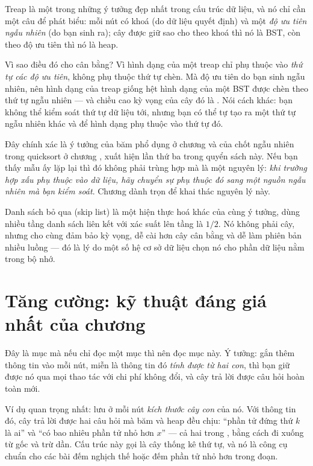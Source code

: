 \documentclass[../../algorithm.tex]{subfiles}
\begin{document}
Treap là một trong những ý tưởng đẹp nhất trong cấu trúc dữ liệu, và nó chỉ cần một câu để phát biểu: mỗi nút có khoá (do dữ liệu quyết định) và một \emph{độ ưu tiên ngẫu nhiên} (do bạn sinh ra); cây được giữ sao cho theo khoá thì nó là BST, còn theo độ ưu tiên thì nó là heap.

Vì sao điều đó cho cân bằng? Vì hình dạng của một treap chỉ phụ thuộc vào \emph{thứ tự các độ ưu tiên}, không phụ thuộc thứ tự chèn. Mà độ ưu tiên do bạn sinh ngẫu nhiên, nên hình dạng của treap giống hệt hình dạng của một BST được chèn theo thứ tự ngẫu nhiên --- và chiều cao kỳ vọng của cây đó là . Nói cách khác: bạn không thể kiểm soát thứ tự dữ liệu tới, nhưng bạn có thể tự tạo ra một thứ tự ngẫu nhiên khác và để hình dạng phụ thuộc vào thứ tự đó.

Đây chính xác là ý tưởng của băm phổ dụng ở chương  và của chốt ngẫu nhiên trong quicksort ở chương , xuất hiện lần thứ ba trong quyển sách này. Nếu bạn thấy mẫu ấy lặp lại thì đó không phải trùng hợp mà là một nguyên lý: \emph{khi trường hợp xấu phụ thuộc vào dữ liệu, hãy chuyển sự phụ thuộc đó sang một nguồn ngẫu nhiên mà bạn kiểm soát}. Chương  dành trọn để khai thác nguyên lý này.

Danh sách bỏ qua (skip list) là một hiện thực hoá khác của cùng ý tưởng, dùng nhiều tầng danh sách liên kết với xác suất lên tầng là \(1/2\). Nó không phải cây, nhưng cho cùng đảm bảo kỳ vọng, dễ cài hơn cây cân bằng và dễ làm phiên bản nhiều luồng --- đó là lý do một số hệ cơ sở dữ liệu chọn nó cho phần dữ liệu nằm trong bộ nhớ.

\section{Tăng cường: kỹ thuật đáng giá nhất của chương}

Đây là mục mà nếu chỉ đọc một mục thì nên đọc mục này. Ý tưởng: gắn thêm thông tin vào mỗi nút, miễn là thông tin đó \emph{tính được từ hai con}, thì bạn giữ được nó qua mọi thao tác với chi phí không đổi, và cây trả lời được câu hỏi hoàn toàn mới.

Ví dụ quan trọng nhất: lưu ở mỗi nút \emph{kích thước cây con} của nó. Với thông tin đó, cây trả lời được hai câu hỏi mà băm và heap đều chịu: ``phần tử đứng thứ \(k\) là ai'' và ``có bao nhiêu phần tử nhỏ hơn \(x\)'' --- cả hai trong , bằng cách đi xuống từ gốc và trừ dần. Cấu trúc này gọi là cây thống kê thứ tự, và nó là công cụ chuẩn cho các bài đếm nghịch thế hoặc đếm phần tử nhỏ hơn trong đoạn.
\end{document}
